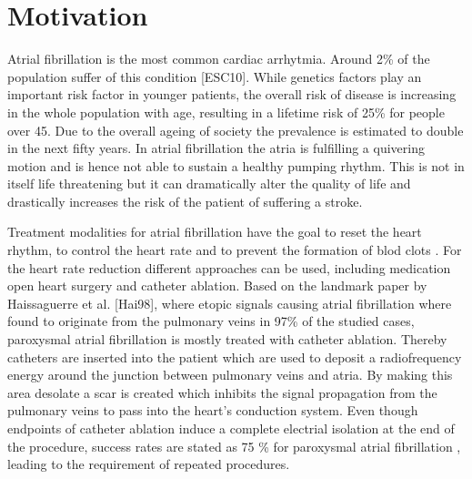 \documentclass[type=dr, dr=rernat, accentcolor=tud7b,colorbacktitle, bigchapter, openright, twoside, 12pt ]{tudthesis}
\begin{document}
\author{MSc Anna Maria Constantinescu}
\date{\today}
\dateofexam{}{}
\makethesistitle



\tableofcontents


\chapter*{Motivation}

Atrial fibrillation is the most common cardiac arrhytmia. Around 2\% of the population suffer of this condition [ESC10]. 
While genetics factors play an important risk factor in younger patients, the overall risk of disease is increasing in the whole population 
with age, resulting in a lifetime risk of 25\% for people over 45. Due to the overall ageing of society the prevalence is estimated to 
double in the next fifty years. In atrial fibrillation the atria is fulfilling a quivering motion and is hence not able to sustain a healthy 
pumping rhythm. This is not in itself life threatening but it can dramatically alter the quality of life and drastically increases the risk of 
the patient of suffering a stroke.\newline

Treatment modalities for atrial fibrillation have the goal to reset the heart rhythm, to control the heart rate and to prevent the formation 
of blod clots \cite{CE09}. For the heart rate reduction different approaches can be used, including medication open heart surgery and catheter 
ablation. Based on the landmark paper by Haissaguerre et al. [Hai98], where etopic signals causing atrial fibrillation where found to originate 
from the pulmonary veins in 97\% of the studied cases, paroxysmal atrial fibrillation is mostly treated with catheter ablation. Thereby 
catheters are inserted into the patient which are used to deposit a radiofrequency energy around the junction between pulmonary veins and atria. 
By making this area desolate a scar is created which inhibits the signal propagation from the pulmonary veins to pass into the heart's 
conduction system. Even though endpoints of catheter ablation induce a complete electrial isolation at the end of the procedure, success rates 
are stated as 75 \% for paroxysmal atrial fibrillation \cite{Cap10} \cite{Sto}, leading to the requirement of repeated procedures. \newline
\end{document}
